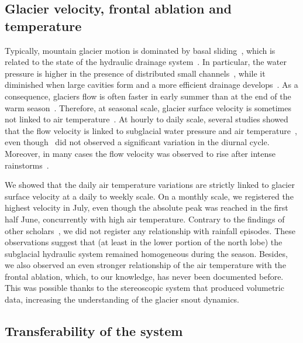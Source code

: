 \subsection{Glacier velocity, frontal ablation and
  temperature}\label{sec:4:discuss_velocity_ablation_temperature}

Typically, mountain glacier motion is dominated by basal sliding~\citep{willis1995intra},
which is related to the state of the hydraulic drainage
system~\citep{vincent2016sliding}.
In particular, the water pressure is higher in the presence of distributed small
channels~\citep{pimentel2011numerical}, while it diminished when large cavities form and
a more
efficient drainage develops~\citep{nienow2005hydrological}.
As a consequence, glaciers flow is often faster in early summer than at the end of the
warm season~\citep{sanders2018variations,vincent2016sliding}.
Therefore, at seasonal scale, glacier surface velocity is sometimes not linked to air
temperature~\citep{sanders2018variations}.
At hourly to daily scale, several studies showed that the flow velocity is linked to
subglacial water pressure \citep{sugiyama2010surface} and air
temperature~\citep{liu2019diurnal},
even though~\citet{allstadt2015observations} did not observed a significant variation in
the diurnal cycle.
Moreover, in many cases the flow velocity was observed to rise after intense
rainstorms~\citep{benoit2015multi,horgan2015glacier,sugiyama2010surface}.

We showed that the daily air temperature variations are strictly linked to glacier
surface velocity at a daily to weekly scale.
On a monthly scale, we registered the highest velocity in July, even though the absolute
peak was reached in the first half June, concurrently with high air temperature.
Contrary to the findings of other
scholars~\citep{benoit2015multi,horgan2015glacier,sugiyama2010surface}, we did not
register any relationship with rainfall episodes.
These observations suggest that (at least in the lower portion of the north lobe) the
subglacial hydraulic system remained homogeneous during the season.
Besides, we also observed an even stronger relationship of the air temperature with the
frontal ablation, which, to our knowledge, has never been documented before.
This was possible thanks to the stereoscopic system that produced volumetric data,
increasing the understanding of the glacier snout dynamics.

\subsection{Transferability of the system}\label{sec:4:transferability}

